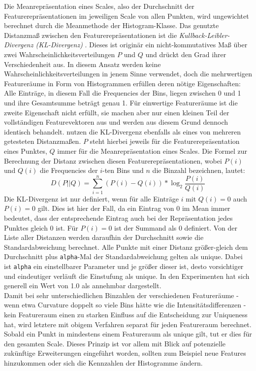 Die Meanrepräsentation eines Scales, also der Durchschnitt der Featurerepräsentationen im jeweiligen Scale von allen Punkten, wird ungewichtet berechnet durch die Meanmethode der Histogram-Klasse. Das genutzte Distanzmaß zwischen den Featurerepräsentationen ist die \textit{Kullback-Leibler-Divergenz (KL-Divergenz)} . Dieses ist originär ein nicht-kommutatives Maß über zwei Wahrscheinlichkeitsverteilungen $P$ und $Q$ und drückt den Grad ihrer Verschiedenheit aus. In diesem Ansatz werden keine Wahrscheinlichkeitsverteilungen in jenem Sinne verwendet, doch die mehrwertigen Featureräume in Form von Histogrammen erfüllen deren nötige Eigenschaften: Alle Einträge, in diesem Fall die Frequencies der Bins, liegen zwischen 0 und 1 und ihre Gesamtsumme beträgt genau 1. Für einwertige Featureräume ist die zweite Eigenschaft nicht erfüllt, sie machen aber nur einen kleinen Teil der vollständigen Featurevektoren aus und werden aus diesem Grund dennoch identisch behandelt. \cite{Rusu.etal-2008} nutzen die KL-Divergenz ebenfalls als eines von mehreren getesteten Distanzmaßen. $P$ steht hierbei jeweils für die Featurerepräsentation eines Punktes, $Q$ immer für die Meanrepräsentation eines Scales.
Die Formel zur Berechnung der Distanz zwischen diesen Featurerepräsentationen, wobei $P(i)$ und $Q(i)$ die Frequencies der $i$-ten Bins und $n$ die Binzahl bezeichnen, lautet:
\begin{equation}    
D(P || Q) = \sum_{i=1}^{n}{(P(i) - Q(i)) * \log_2{\frac{P(i)}{Q(i)}}}
\end{equation}
Die KL-Divergenz ist nur definiert, wenn für alle Einträge $i$ mit $Q(i)=0$ auch $P(i)=0$ gilt. Dies ist hier der Fall, da ein Eintrag von 0 im Mean immer bedeutet, dass der entsprechende Eintrag auch bei der Repräsentation jedes Punktes gleich 0 ist. Für $P(i)=0$ ist der Summand als 0 definiert. Von der Liste aller Distanzen werden daraufhin der Durchschnitt sowie die Standardabweichung berechnet. Alle Punkte mit einer Distanz größer-gleich dem Durchschnitt plus \texttt{alpha}-Mal der Standardabweichung gelten als unique. Dabei ist \texttt{alpha} ein einstellbarer Parameter und je größer dieser ist, desto vorsichtiger und eindeutiger verläuft die Einstufung als unique. In den Experimenten hat sich generell ein Wert von 1.0 als annehmbar dargestellt. \\
Damit bei sehr unterschiedlichen Binzahlen der verschiedenen Featureräume - wenn etwa Curvature doppelt so viele Bins hätte wie die Intensitätsdifferenzen - kein Featureraum einen zu starken Einfluss auf die Entscheidung zur Uniqueness hat, wird letztere mit obigem Verfahren separat für jeden Featureraum berechnet. Sobald ein Punkt in mindestens einem Featureraum als unique gilt, tut er dies für den gesamten Scale. Dieses Prinzip ist vor allem mit Blick auf potenzielle zukünftige Erweiterungen eingeführt worden, sollten zum Beispiel neue Features hinzukommen oder sich die Kennzahlen der Histogramme ändern.

